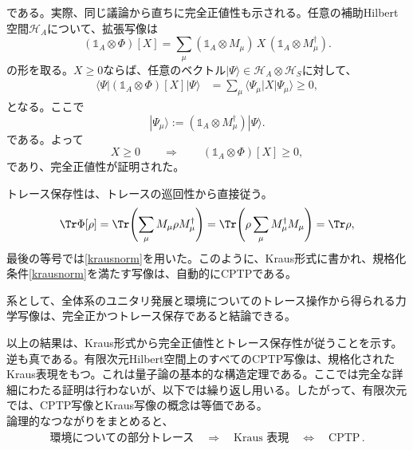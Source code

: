 \documentclass[a4paper,11pt,oneside]{article}
\theoremstyle{definition}
\numberwithin{equation}{section}
\newcommand{\then}{\quad \Rightarrow\quad}
\begin{document}
である。実際、同じ議論から直ちに完全正値性も示される。任意の補助Hilbert空間$\mathcal H_A$について、拡張写像は
\begin{equation}
(\mathds{1} _A \otimes \Phi)[X]
=
\sum_\mu
(\mathds{1} _A \otimes M_\mu)\,X\,(\mathds{1} _A \otimes M_\mu^\dagger) .
\end{equation}
の形を取る。$X \geq 0$ならば、任意のベクトル$|\Psi\rangle \in \mathcal H_A \otimes \mathcal H_S$に対して、
\begin{align}
\langle \Psi | (\mathds{1} _A \otimes \Phi)[X] | \Psi \rangle
&=
\sum_\mu
\langle \Psi_\mu | X | \Psi_\mu \rangle
\geq 0 ,
\end{align}
となる。ここで
\begin{equation}
|\Psi_\mu\rangle := (\mathds{1} _A \otimes M_\mu^\dagger)|\Psi\rangle .
\end{equation}
である。よって
\begin{equation}
X \geq 0
\qquad \Longrightarrow \qquad
(\mathds{1} _A \otimes \Phi)[X] \geq 0 ,
\end{equation}
であり、完全正値性が証明された。



トレース保存性は、トレースの巡回性から直接従う。
\begin{align}
\Tr \Phi[\rho]
=
\Tr\!\left(\sum_\mu M_\mu \rho M_\mu^\dagger\right)
=
\Tr\!\left(\rho \sum_\mu M_\mu^\dagger M_\mu\right)
=
\Tr \rho ,
\end{align}
最後の等号では\eqref{krausnorm}を用いた。このように、Kraus形式に書かれ、規格化条件\eqref{krausnorm}を満たす写像は、自動的にCPTPである。



系として、全体系のユニタリ発展と環境についてのトレース操作から得られる力学写像は、完全正かつトレース保存であると結論できる。



以上の結果は、Kraus形式から完全正値性とトレース保存性が従うことを示す。逆も真である。有限次元Hilbert空間上のすべてのCPTP写像は、規格化されたKraus表現をもつ。これは量子論の基本的な構造定理である。ここでは完全な詳細にわたる証明は行わないが、以下では繰り返し用いる。したがって、有限次元では、CPTP写像とKraus写像の概念は等価である。\\



論理的なつながりをまとめると、
\begin{align}
\text{環境についての部分トレース} \then \text{Kraus 表現} \quad \Leftrightarrow \quad \text{CPTP}\,.
\end{align}
\end{document}
